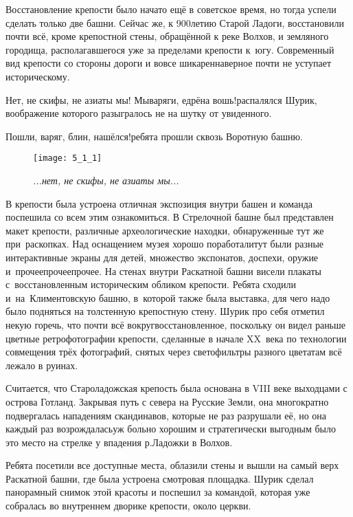 Восстановление крепости было начато ещё в советское время, но тогда успели сделать только две башни. Сейчас же, к 900\sdash летию Старой Ладоги, восстановили почти всё, кроме крепостной стены, обращённой к реке Волхов, и земляного городища, располагавшегося уже за пределами крепости к~югу. Современный вид крепости со стороны дороги и вовсе шикарен\mdash наверное почти не уступает историческому. 

\diagdash Нет, не скифы, не азиаты мы! Мы\mdash варяги, едрёна вошь!\mdash распалялся Шурик, воображение которого разыгралось не на шутку от увиденного.

\diagdash Пошли, варяг, блин, нашёлся!\mdash ребята прошли сквозь Воротную башню.

{
	\begin{figure}[h]
		\centering
		\texttt{[image: 5\_1\_1]}
		\caption{\small\textit{...нет, не скифы, не азиаты мы...}}
	\end{figure}
}

В крепости была устроена отличная экспозиция внутри башен и команда поспешила со всем этим ознакомиться. В Стрелочной башне был представлен макет крепости, различные археологические находки, обнаруженные тут же при~раскопках. Над оснащением музея хорошо поработали\mdash тут были разные интерактивные экраны для детей, множество экспонатов, доспехи, оружие и~прочее\sdash прочее\sdash прочее. На стенах внутри Раскатной башни висели плакаты с~восстановленным историческим обликом крепости. Ребята сходили и~на~Климентовскую башню, в~которой также была выставка, для чего надо было подняться на толстенную крепостную стену. Шурик про себя отметил некую горечь, что почти всё вокруг\mdash восстановленное, поскольку он видел раньше цветные ретро\sdash фотографии крепости, сделанные в начале XX~века по технологии совмещения трёх фотографий, снятых через светофильтры разного цвета\cite{ПрокудинГорский}\mdash там всё лежало в руинах.

Считается, что Староладожская крепость была основана в VIII веке выходцами с острова Готланд\cite{ЛебедевЛадога}. Закрывая путь с севера на Русские Земли, она многократно подвергалась нападениям скандинавов, которые не раз разрушали её, но она каждый раз возрождалась\mdash уж больно хорошим и стратегически выгодным было это место на стрелке у впадения р.\thinspace Ладожки в Волхов.

Ребята посетили все доступные места, облазили стены и вышли на самый верх Раскатной башни, где была устроена смотровая площадка. Шурик сделал панорамный снимок этой красоты и поспешил за командой, которая уже собралась во внутреннем дворике крепости, около церкви.

